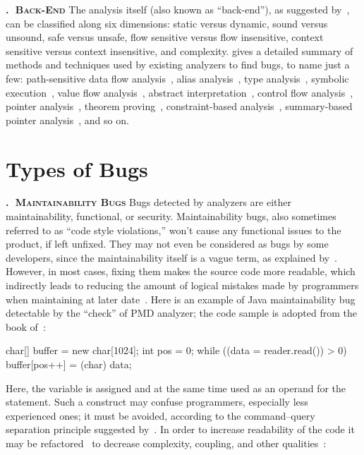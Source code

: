 \documentclass[nosecurity,nobrand]{huawei}
\newcounter{sector}[section]
\renewcommand\thesector{\thesection.\arabic{sector}}
\newcommand{\sector}[1]{\refstepcounter{sector}\vspace{6pt}\textbf{\textsc{\thesector $\;$ #1}}\quad}
\begin{document}
\sector{Back-End}
The analysis itself (also known as ``back-end''),
as suggested by~\citet{binkley2007source},
can be classified along six dimensions: static versus dynamic, sound versus unsound,
safe versus unsafe, flow sensitive versus flow insensitive,
context sensitive versus context insensitive, and complexity.
\citet{gosain2015static} gives a detailed summary of methods and techniques
used by existing analyzers to find bugs, to name just a few:
path-sensitive data flow analysis~\citep{kremenek2008},
alias analysis~\citep{aliasanalysis},
type analysis~\citep{wand1987simple},
symbolic execution~\citep{Slaby2013AutomaticBT},
value flow analysis~\citep{svf},
abstract interpretation~\citep{Slaby2013AutomaticBT},
control flow analysis~\citep{allen1970control},
pointer analysis~\citep{smaragdakis2015pointer},
theorem proving~\citep{darvas2005theorem},
constraint-based analysis~\citep{ConstraintAnalysis},
summary-based pointer analysis~\citep{PointerAnalysis},
and so on.

\section{Types of Bugs}

\sector{Maintainability Bugs}
Bugs detected by analyzers are either maintainability, functional, or security.
Maintainability bugs, also sometimes referred to as ``code style violations,''
won't cause any functional issues to the product, if left unfixed.
They may not even be considered as bugs by some developers, since
the maintainability itself is a vague term, as explained by~\citet{broy2006demystifying}.
However, in most cases, fixing them makes the source code more readable,
which indirectly leads to
reducing the amount of logical mistakes made by programmers when maintaining at
later date~\citep{posnett2011simpler}.
Here is an example
of Java maintainability bug detectable by the
\href{https://pmd.github.io/latest/pmd_rules_ecmascript_codestyle.html#assignmentinoperand}{}
``check'' of PMD analyzer; the code sample is adopted
from the book of~\citet[p.475]{sierra2005head}:

\begin{ffcode}[language=Java]
char[] buffer = new char[1024];
int pos = 0;
while ((data = reader.read()) > 0) {
  buffer[pos++] = (char) data;
}
\end{ffcode}

Here, the variable  is assigned and at the same time used
as an operand for the  statement. Such a construct
may confuse programmers, especially less experienced ones; it must be avoided,
according to the command–query separation principle suggested by~\citet{meyer1997object}.
In order to increase
readability of the code it may be refactored~\citep{fowler2018refactoring}
to decrease complexity, coupling, and other qualities~\citep{yamashita2012code}:
\end{document}
